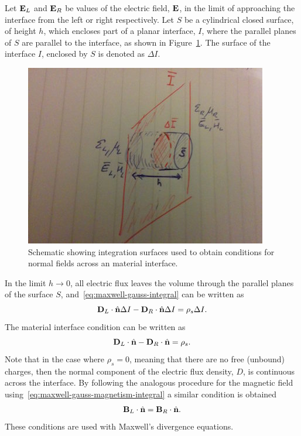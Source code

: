 Let $\mathbf{E}_L$ and $\mathbf{E}_R$ be values of the electric field, $\mathbf{E}$, in the limit of
approaching the interface from the left or right respectively. Let $S$ be a
cylindrical closed surface, of height $h$, which encloses part of a planar
interface, $I$, where the parallel planes of $S$ are parallel to the interface,
as shown in Figure~\ref{fig:material-interface-derivation:E-pillbox}. The
surface of the interface $I$, enclosed by $S$ is denoted as $\Delta I$.
\begin{figure}[htbp!]
  \begin{center}
    \includegraphics[height=0.3\textheight]{Figures/Chapters/PhysicalProblem/interfaceEPillBox}
  \end{center}
  \caption{Schematic showing integration surfaces used to obtain conditions for
    normal fields across an material interface.}
  \label{fig:material-interface-derivation:E-pillbox}
\end{figure}
In the limit $h \to 0$, all electric flux leaves the volume through the parallel
planes of the surface $S$, and~\eqref{eq:maxwell-gauss-integral} can be written
as
$$
\mathbf{D}_L \cdot \hat{\mathbf{n}} \Delta I - \mathbf{D}_R \cdot \hat{\mathbf{n}}
\Delta I = \rho_s \Delta I.
$$
The material interface condition can be written as
$$
\mathbf{D}_L \cdot \hat{\mathbf{n}} - \mathbf{D}_R \cdot \hat{\mathbf{n}} = \rho_s .
$$
Note that in the case where $\rho_s = 0$, meaning that there are no free
(unbound) charges, then the normal component of the electric flux density, $D$,
is continuous across the interface. By following the analogous procedure for the
magnetic field using~\eqref{eq:maxwell-gauss-magnetism-integral} a similar condition is obtained
$$
\mathbf{B}_L \cdot \hat{\mathbf{n}} = \mathbf{B}_R \cdot \hat{\mathbf{n}} .
$$
These conditions are used with Maxwell's divergence equations.

